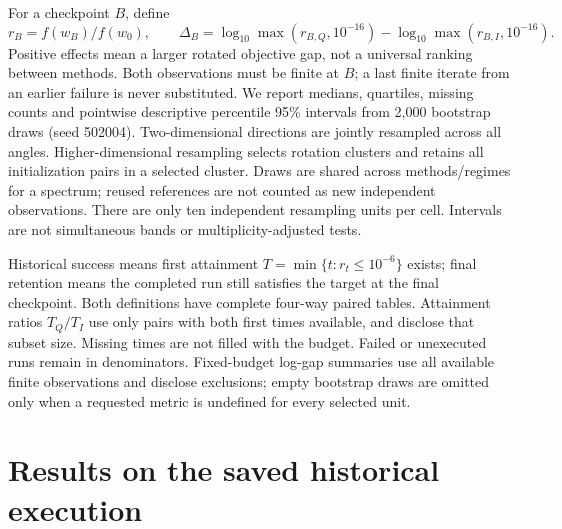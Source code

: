 \documentclass[10pt,a4paper]{article}
\begin{document}
For a checkpoint $B$, define
\[
 r_B=f(w_B)/f(w_0),\qquad
 \Delta_B=\log_{10}\max(r_{B,Q},10^{-16})-
           \log_{10}\max(r_{B,I},10^{-16}).
\]
Positive effects mean a larger rotated objective gap, not a universal ranking
between methods. Both observations must be finite at $B$; a last finite iterate
from an earlier failure is never substituted. We report medians, quartiles,
missing counts and pointwise descriptive percentile 95\% intervals from 2,000
bootstrap draws (seed 502004). Two-dimensional directions are jointly resampled
across all angles. Higher-dimensional resampling selects rotation clusters and
retains all initialization pairs in a selected cluster. Draws are shared across
methods/regimes for a spectrum; reused references are not counted as new
independent observations. There are only ten independent resampling units per
cell. Intervals are not simultaneous bands or multiplicity-adjusted tests.

Historical success means first attainment $T=\min\{t:r_t\le10^{-6}\}$ exists;
final retention means the completed run still satisfies the target at the final
checkpoint. Both definitions have complete four-way paired tables. Attainment
ratios $T_Q/T_I$ use only pairs with both first times available, and disclose that
subset size. Missing times are not filled with the budget. Failed or unexecuted
runs remain in denominators. Fixed-budget log-gap summaries use all available
finite observations and disclose exclusions; empty bootstrap draws are omitted
only when a requested metric is undefined for every selected unit.

\section{Results on the saved historical execution}
\end{document}
